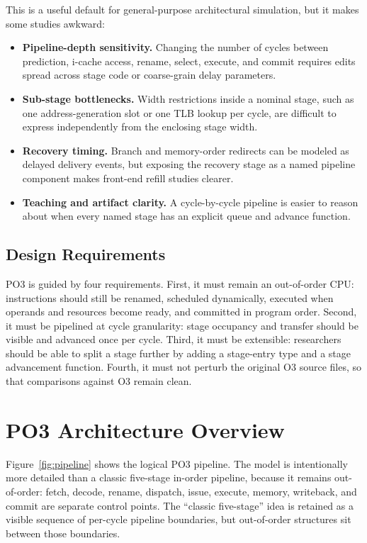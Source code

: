 \documentclass[10pt,twocolumn]{article}
\newcommand{\po}{\textsc{PO3}}
\newcommand{\oo}{\textsc{O3}}
\begin{document}
This is a useful default for general-purpose architectural simulation, but it makes some studies awkward:
\begin{itemize}
  \item \textbf{Pipeline-depth sensitivity.}  Changing the number of cycles between prediction, i-cache access, rename, select, execute, and commit requires edits spread across stage code or coarse-grain delay parameters.
  \item \textbf{Sub-stage bottlenecks.}  Width restrictions inside a nominal stage, such as one address-generation slot or one TLB lookup per cycle, are difficult to express independently from the enclosing stage width.
  \item \textbf{Recovery timing.}  Branch and memory-order redirects can be modeled as delayed delivery events, but exposing the recovery stage as a named pipeline component makes front-end refill studies clearer.
  \item \textbf{Teaching and artifact clarity.}  A cycle-by-cycle pipeline is easier to reason about when every named stage has an explicit queue and advance function.
\end{itemize}

\subsection{Design Requirements}
\po{} is guided by four requirements.  First, it must remain an out-of-order CPU: instructions should still be renamed, scheduled dynamically, executed when operands and resources become ready, and committed in program order.  Second, it must be pipelined at cycle granularity: stage occupancy and transfer should be visible and advanced once per cycle.  Third, it must be extensible: researchers should be able to split a stage further by adding a stage-entry type and a stage advancement function.  Fourth, it must not perturb the original \oo{} source files, so that comparisons against \oo{} remain clean.

\section{PO3 Architecture Overview}
Figure~\ref{fig:pipeline} shows the logical \po{} pipeline.  The model is intentionally more detailed than a classic five-stage in-order pipeline, because it remains out-of-order: fetch, decode, rename, dispatch, issue, execute, memory, writeback, and commit are separate control points.  The ``classic five-stage'' idea is retained as a visible sequence of per-cycle pipeline boundaries, but out-of-order structures sit between those boundaries.
\end{document}
